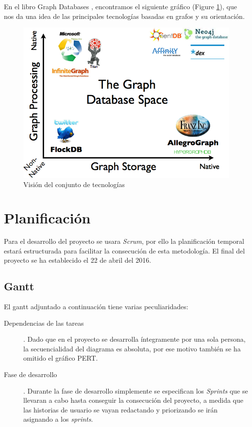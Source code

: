 \documentclass[12pt]{article} %
\begin{document}
En el libro Graph Databases \cite{graphdbbook}, encontramos el siguiente gráfico (Figure \ref{fig:grdb}), que nos da una idea de las principales tecnologías basadas en grafos y su orientación.

\begin{figure}[ht!]
\center
\includegraphics{grdb.png}
\caption{Visión del conjunto de tecnologías}
\label{fig:grdb}
\end{figure}


\afterpage{\null\newpage}
\newpage


\section{Planificación}
Para el desarrollo del proyecto se usara \textit{Scrum}, por ello la planificación temporal estará estructurada para facilitar la consecución de esta metodología. El final del proyecto se ha establecido el 22 de abril del 2016.

\subsection{Gantt}
El gantt adjuntado a continuación tiene varias peculiaridades:
\begin{description}
\item [Dependencias de las tareas]. 
\linebreak Dado que en el proyecto se desarrolla íntegramente por una sola persona, la secuencialidad del diagrama es absoluta, por ese motivo también se ha omitido el gráfico PERT.
\item [Fase de desarrollo].
\linebreak Durante la fase de desarrollo simplemente se especifican los \textit{Sprints} que se llevaran a cabo hasta conseguir la consecución del proyecto, a medida que las historias de usuario se vayan redactando y priorizando se irán asignando a los \textit{sprints}.
\end{description}
\newpage
\end{document}
